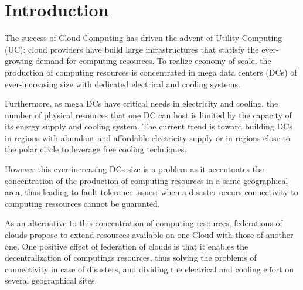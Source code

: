 \section{Introduction}
\label{sec:intro} 


The success of Cloud Computing has driven the advent of Utility Computing (UC): 
cloud providers have build large infrastructures that statisfy the ever-growing 
demand for computing resources. To realize economy of scale, the production
of computing resources is concentrated in mega data centers (DCs) of 
ever-increasing size with dedicated electrical and cooling systems.

Furthermore, as mega DCs have critical needs in electricity and cooling, the
number of physical resources that one DC can host is limited by the capacity of
its energy supply and cooling system. The current trend is toward building DCs
in regions with abundant and affordable electricity supply or in regions close
to the polar circle to leverage free cooling techniques. 

However this ever-increasing DCs size is a problem as it accentuates the 
concentration of the production of computing resources in a same geographical
area, thus leading to fault tolerance issues: when a disaster occurs 
connectivity to computing ressources cannot be guaranted.

As an alternative to this concentration of computing resources, federations of
clouds propose to extend resources available on one Cloud with those of another
one. One positive effect of federation of clouds is that it enables the 
decentralization of computings resources, thus solving the problems of 
connectivity in case of disasters, and dividing the electrical and cooling 
effort on several geographical sites.

